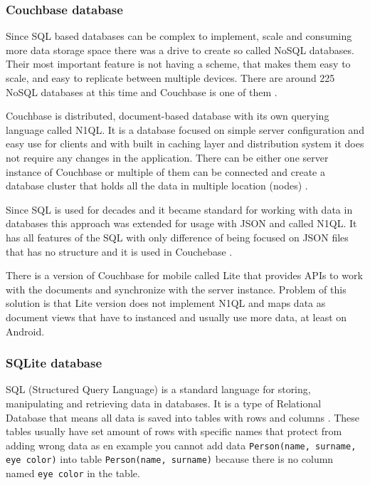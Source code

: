 \subsubsection{Couchbase database}\label{subsec:CouchbaseDatabase}
Since SQL based databases can be complex to implement, scale and consuming more data storage space there was a drive to create so called NoSQL databases. Their most important feature is not having a scheme, that makes them easy to scale, and easy to replicate between multiple devices. There are around 225 NoSQL databases at this time and Couchbase is one of them \cite{NOSQLDB}.

Couchbase is distributed, document-based database with its own querying language called N1QL. It is a database focused on simple server configuration and easy use for clients and with built in caching layer and distribution system it does not require any changes in the application. There can be either one server instance of Couchbase or multiple of them can be connected and create a database cluster that holds all the data in multiple location (nodes) \cite{GSWCBS}.

Since SQL is used for decades and it became standard for working with data in databases this approach was extended for usage with JSON and called N1QL. It has all features of the SQL with only difference of being focused on JSON files that has no structure and it is used in Couchebase \cite{WINQL}.

There is a version of Couchbase for mobile called Lite that provides APIs to work with the documents and synchronize with the server instance. Problem of this solution is that Lite version does not implement N1QL and maps data as document views that have to instanced and usually use more data, at least on Android. 

\subsubsection{SQLite database}\label{subsec:SQLiteDatabase}
SQL (Structured Query Language) is a standard language for storing, manipulating and retrieving data in databases. It is a type of Relational Database that means all data is saved into tables with rows and columns \cite{ItSQL}. These tables usually have set amount of rows with specific names that protect from adding wrong data as en example you cannot add data \verb|Person(name, surname, eye color)| into table \verb|Person(name, surname)| because there is no column named \verb|eye color| in the table.

